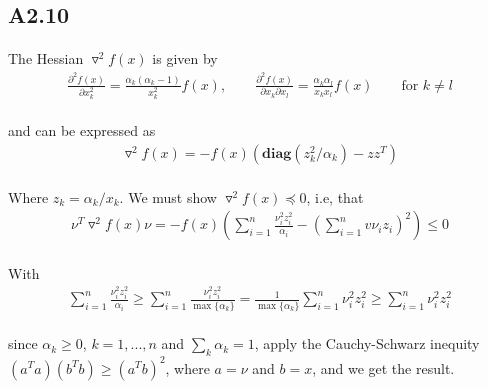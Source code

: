 \subsection*{A2.10}
\paragraph{}
The Hessian $\triangledown^2f(x)$ is given by
\begin{align*}
\frac{\partial^2f(x)}{\partial x^2_k} = \frac{\alpha_k(\alpha_k-1)}{x_k^2}f(x),
\qquad 
\frac{\partial^2f(x)}{\partial x_k\partial x_l} = \frac{\alpha_k \alpha_l}{x_k x_l}f(x) \qquad \text{for }k \neq l
\end{align*}
\paragraph{}
and can be expressed as
\begin{align*}
	\triangledown^2f(x) = -f(x)(\textbf{diag}(z_k^2/\alpha_k)-zz^T)
\end{align*}
\paragraph{}
Where $z_k=\alpha_k/x_k$. We must show $\triangledown^2f(x) \preceq 0$, i.e, that 
\begin{align*}
\nu^T\triangledown^2f(x)\nu =-f(x)(\sum_{i=1}^{n}\frac{\nu_i^2 z_i^2}{\alpha_i}-(\sum_{i=1}^{n}v\nu_iz_i)^2) \leq 0
\end{align*}
\paragraph{}
With
\begin{align*}
	\sum_{i=1}^{n}\frac{\nu_i^2 z_i^2}{\alpha_i} \geq \sum_{i=1}^{n}\frac{\nu_i^2 z_i^2}{\max\{\alpha_k\}}=  \frac{1}{\max\{\alpha_k\}}\sum_{i=1}^{n}\nu_i^2 z_i^2 \geq \sum_{i=1}^{n}\nu_i^2 z_i^2
\end{align*}
\paragraph{}
since $\alpha_k \geq 0$, $k=1,...,n$ and $\sum_k\alpha_k=1$, apply the Cauchy-Schwarz inequity $(a^Ta)(b^Tb)\geq (a^Tb)^2$, where $a=\nu$ and $b=x$, and we get the result.